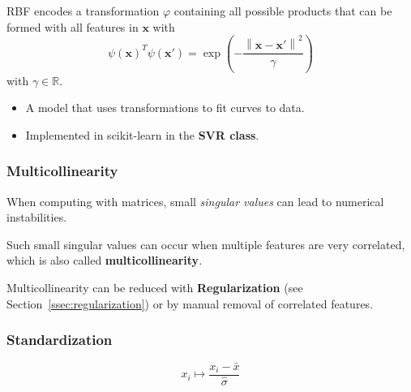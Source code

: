 
RBF encodes a transformation $\varphi$ containing all possible products that can be formed with all features in $\mathbf{x}$ with
\begin{equation*}
    {\psi(\mathbf{x})}^T\psi(\mathbf{x}')=\exp\left(-\frac{\left\|\mathbf{x}-\mathbf{x}'\right\|^{2}}{\gamma}\right)
\end{equation*}
with $\gamma \in \mathbb{R}$.


\begin{itemize}
    \item A model that uses transformations to fit curves to data.
    \item Implemented in scikit-learn in the \textbf{SVR class}.
\end{itemize}


\subsubsection{Multicollinearity}
When computing with matrices, small \textit{singular values} can lead to numerical instabilities. 

Such small singular values can occur when multiple features are very correlated, which is also called \textbf{multicollinearity}.

Multicollinearity can be reduced with \textbf{Regularization} (see Section\ \ref{ssec:regularization}) or by manual removal of correlated features.

\subsubsection{Standardization}
\noindent\begin{equation*}
    x_i\mapsto\frac{x_i-\bar{x}}{\widehat{\sigma}}
\end{equation*}
